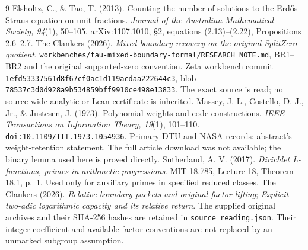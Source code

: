 \begin{thebibliography}{9}
 Elsholtz, C., \& Tao, T. (2013).
Counting the number of solutions to the Erd\H{o}s--Straus equation on unit fractions.
\emph{Journal of the Australian Mathematical Society, 94}(1), 50--105.
arXiv:1107.1010, \S2, equations (2.13)--(2.22), Propositions 2.6--2.7.
 The Clankers (2026).
\emph{Mixed-boundary recovery on the original SplitZero quotient}.
\texttt{workbenches/tau-mixed-boundary-formal/RESEARCH\_NOTE.md},
BR1--BR2 and the original supported-zero convention.
Zeta workbench commit \texttt{1efd53337561d8f67cf0ac1d119acdaa222644c3},
blob \texttt{78537c3d0d928a9b534859bff9910ce498e13833}.
The exact source is read; no source-wide analytic or Lean certificate is inherited.
 Massey, J. L., Costello, D. J., Jr., \& Justesen, J. (1973).
Polynomial weights and code constructions.
\emph{IEEE Transactions on Information Theory, 19}(1), 101--110.
\texttt{doi:10.1109/TIT.1973.1054936}.
Primary DTU and NASA records: abstract's weight-retention statement. The full
article download was not available; the binary lemma used here is proved directly.
 Sutherland, A. V. (2017).
\emph{Dirichlet L-functions, primes in arithmetic progressions}.
MIT 18.785, Lecture 18, Theorem 18.1, p.~1.
Used only for auxiliary primes in specified reduced classes.
 The Clankers (2026).
\emph{Relative boundary packets and original factor lifting};
\emph{Explicit two-adic logarithmic capacity and its relative return}.
The supplied original archives and their SHA-256 hashes are retained in
\texttt{source\_reading.json}. Their integer coefficient and available-factor
conventions are not replaced by an unmarked subgroup assumption.
\end{thebibliography}
